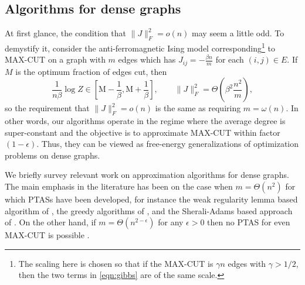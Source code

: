 \documentclass[11pt, oneside, english]{article}
\theoremstyle{definition}
\theoremstyle{plain}
\begin{document}
\subsection{Algorithms for dense graphs}

At first glance, the condition that $\|J\|_F^2 = o(n)$ may seem a little odd. 
To demystify it, consider the anti-ferromagnetic Ising model corresponding\footnote{The scaling here is chosen so that if the MAX-CUT is $\gamma n$ edges with $\gamma > 1/2$, then the two terms in \eqref{eqn:gibbs} are of the same scale.}
to MAX-CUT on a graph with $m$ edges
which has $J_{ij} = -\frac{\beta n}{m}$ for each $(i,j) \in E$. If $M$ is the optimum fraction of edges cut, then
\begin{equation}\label{eqn:max-cut-ising}
\frac{1}{n\beta} \log Z \in \left[\text{M} - \frac{1}{\beta}, \text{M} + \frac{1}{\beta}\right], \qquad \|J\|_F^2 = \Theta\left(\beta^2 \frac{n^2}{m}\right),
\end{equation}
so the requirement that $\|J\|_F^2 = o(n)$ is the same as requiring $m = \omega(n)$. In other words, our algorithms operate in the regime where the average degree is super-constant and the objective is to approximate MAX-CUT within factor $(1 - \epsilon)$.
Thus, they can be viewed as free-energy generalizations of optimization problems on dense graphs. 

We briefly survey relevant work on approximation algorithms for dense graphs. The main emphasis in the literature has been on the case when $m = \Theta(n^2)$ for which PTASs have been developed, for instance the weak regularity lemma based algorithm of \cite{frieze-kannan-matrix}, the greedy algorithms of \cite{mathieu-schudy}, and the Sherali-Adams based approach of \cite{delavega2007linear}. On the other hand, if $m = \Theta(n^{2 - \epsilon})$ for any $\epsilon > 0$ then no PTAS for even MAX-CUT is possible \cite{less-dense-maxcut-hardness}. 

\end{document}
